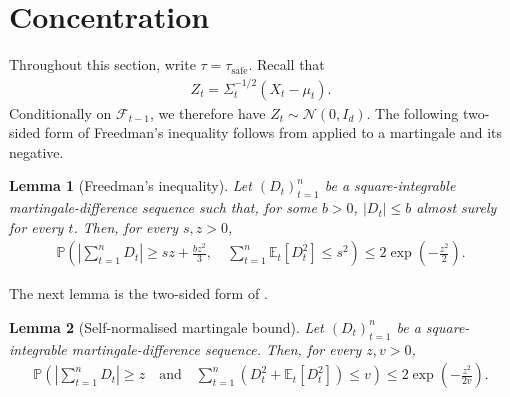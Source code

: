 \documentclass[11pt]{article}
\newtheorem{lemma}[lemma]{Lemma}
\newcommand{\E}{\mathbb E}
\newcommand{\Pp}{\mathbb P}
\newcommand{\F}{\mathcal F}
\newcommand{\N}{\mathcal N}
\newcommand{\1}{\mathbf 1}
\begin{document}
\section{Concentration}
\label{app:concentration}
Throughout this section, write $\tau=\tau_{\mathrm{safe}}$.
Recall that
\begin{align}
    Z_t=\Sigma_t^{-1/2}(X_t-\mu_t).
\end{align}
Conditionally on $\F_{t-1}$, we therefore have
$Z_t\sim\N(0,I_d)$.
The following two-sided form of Freedman's inequality follows from
\citet[Theorem~3.10]{bercu2015concentration} applied to a martingale and its
negative.
\begin{lemma}[Freedman's inequality]
    \label{lem:freedman}
    Let $(D_t)_{t=1}^n$ be a square-integrable
    martingale-difference sequence such that, for some $b>0$,
    $|D_t|\leq b$ almost surely for every $t$. Then, for every $s,z>0$,
    \begin{align}
        \Pp\left(
        \left|\sum_{t=1}^n D_t\right|
        \geq sz+\frac{bz^2}{3},
        \quad
        \sum_{t=1}^n\E_t[D_t^2]\leq s^2
        \right)
        \leq
        2\exp\left(-\frac{z^2}{2}\right).
    \end{align}
\end{lemma}

The next lemma is the two-sided form of
\citet[Theorem~3.26]{bercu2015concentration}.
\begin{lemma}[Self-normalised martingale bound]
    \label{lem:self-normalised-martingale}
    Let $(D_t)_{t=1}^n$ be a square-integrable
    martingale-difference sequence. Then, for every $z,v>0$,
    \begin{align}
        \Pp\left(
        \left|\sum_{t=1}^n D_t\right|\geq z\quad\text{and}\quad
        \sum_{t=1}^n \left(D_t^2+\E_t[D_t^2]\right)\leq v
        \right)
        \leq
        2\exp\left(-\frac{z^2}{2v}\right).
        \label{eq:self-normalised-martingale}
    \end{align}
\end{lemma}
\end{document}
